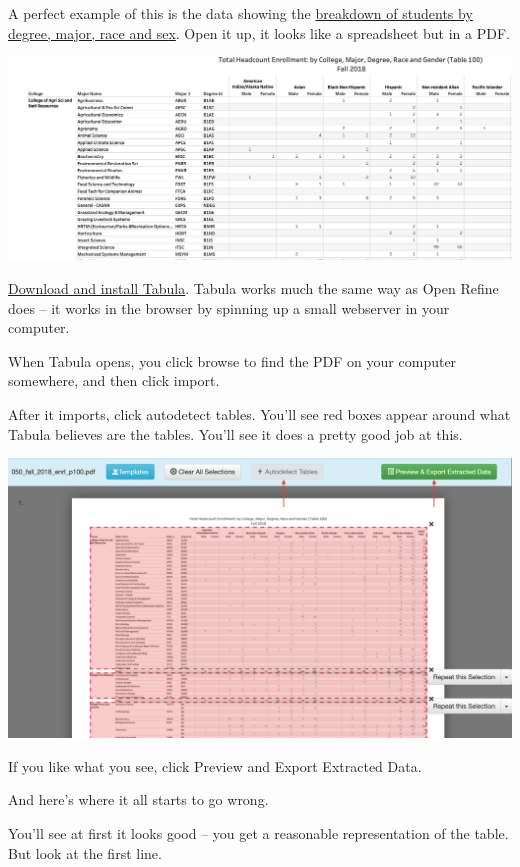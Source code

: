 \documentclass[]{book}
\begin{document}
A perfect example of this is the data showing the \href{https://iea.unl.edu/dmdocuments/050_fall_2018_enrl_p100.pdf}{breakdown of students by degree, major, race and sex}. Open it up, it looks like a spreadsheet but in a PDF.

\includegraphics[width=27.58in]{images/pdfs1}

\href{https://tabula.technology/}{Download and install Tabula}. Tabula works much the same way as Open Refine does -- it works in the browser by spinning up a small webserver in
your computer.

When Tabula opens, you click browse to find the PDF on your computer somewhere, and then click import.

After it imports, click autodetect tables. You'll see red boxes appear around what Tabula believes are the tables. You'll see it does a pretty good job at this.

\includegraphics[width=39.22in]{images/pdfs2}

If you like what you see, click Preview and Export Extracted Data.

And here's where it all starts to go wrong.

You'll see at first it looks good -- you get a reasonable representation of the table. But look at the first line.
\end{document}
